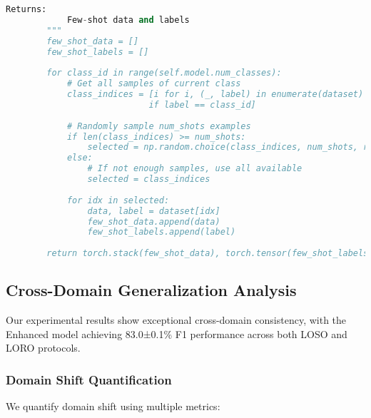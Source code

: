 \documentclass[journal]{IEEEtran}
\begin{document}
\begin{lstlisting}[language=Python, caption=Progressive Few-Shot Learning Strategy]
        Returns:
            Few-shot data and labels
        """
        few_shot_data = []
        few_shot_labels = []
        
        for class_id in range(self.model.num_classes):
            # Get all samples of current class
            class_indices = [i for i, (_, label) in enumerate(dataset) 
                            if label == class_id]
            
            # Randomly sample num_shots examples
            if len(class_indices) >= num_shots:
                selected = np.random.choice(class_indices, num_shots, replace=False)
            else:
                # If not enough samples, use all available
                selected = class_indices
            
            for idx in selected:
                data, label = dataset[idx]
                few_shot_data.append(data)
                few_shot_labels.append(label)
        
        return torch.stack(few_shot_data), torch.tensor(few_shot_labels)
\end{lstlisting}

\subsection{Cross-Domain Generalization Analysis}

Our experimental results show exceptional cross-domain consistency, with the Enhanced model achieving 83.0±0.1\% F1 performance across both LOSO and LORO protocols.

\subsubsection{Domain Shift Quantification}

We quantify domain shift using multiple metrics:
\end{document}
